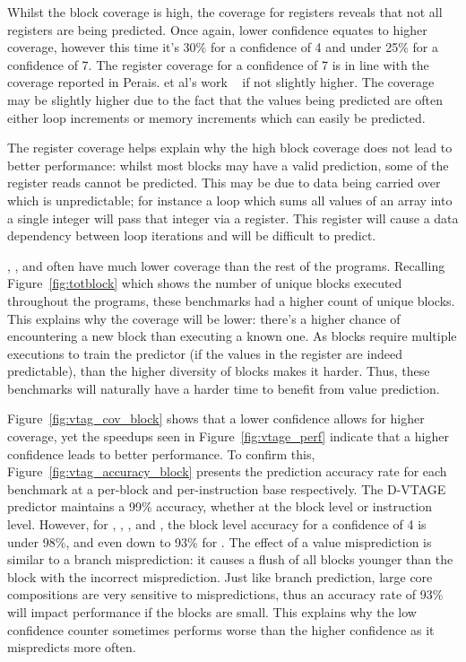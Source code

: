 Whilst the block coverage is high, the coverage for registers reveals that not all registers are being predicted.
Once again, lower confidence equates to higher coverage, however this time it's 30\% for a confidence of 4 and under 25\% for a confidence of 7.
The register coverage for a confidence of 7 is in line with the coverage reported in Perais. et al's work ~\cite{peraisBeBop2015, peraisVTAGE2014} if not slightly higher.
The coverage may be slightly higher due to the fact that the values being predicted are often either loop increments or memory increments which can easily be predicted.

The register coverage helps explain why the high block coverage does not lead to better performance: whilst most blocks may have a valid prediction, some of the register reads cannot be predicted.
This may be due to data being carried over which is unpredictable; for instance a loop which sums all values of an array into a single integer will pass that integer via a register.
This register will cause a data dependency between loop iterations and will be difficult to predict.

, ,  and  often have much lower coverage than the rest of the programs.
Recalling Figure~\ref{fig:totblock} which shows the number of unique blocks executed throughout the programs, these benchmarks had a higher count of unique blocks.
This explains why the coverage will be lower: there's a higher chance of encountering a new block than executing a known one.
As blocks require multiple executions to train the predictor (if the values in the register are indeed predictable), than the higher diversity of blocks makes it harder.
Thus, these benchmarks will naturally have a harder time to benefit from value prediction.

Figure~\ref{fig:vtag_cov_block} shows that a lower confidence allows for higher coverage, yet the speedups seen in Figure~\ref{fig:vtage_perf} indicate that a higher confidence leads to better performance.
To confirm this, Figure~\ref{fig:vtag_accuracy_block} presents the prediction accuracy rate for each benchmark at a per-block and per-instruction base respectively.
The D-VTAGE predictor maintains a 99\% accuracy, whether at the block level or instruction level.
However, for , , ,  and , the block level accuracy for a confidence of 4 is under 98\%, and even down to 93\% for .
The effect of a value misprediction is similar to a branch misprediction: it causes a flush of all blocks younger than the block with the incorrect misprediction.
Just like branch prediction, large core compositions are very sensitive to mispredictions, thus an accuracy rate of 93\% will impact performance if the blocks are small.
This explains why the low confidence counter sometimes performs worse than the higher confidence as it mispredicts more often.

